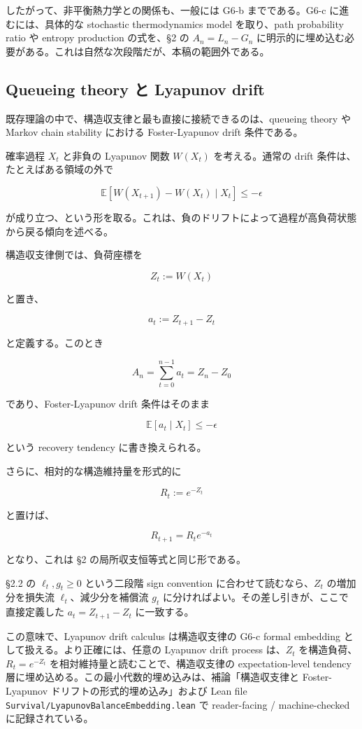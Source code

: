 \documentclass[12pt,a4paper]{article}
\begin{document}
したがって、非平衡熱力学との関係も、一般には G6-b までである。G6-c に進むには、具体的な stochastic thermodynamics model を取り、path probability ratio や entropy production の式を、§2 の \(A_{n}=L_{n}-G_{n}\) に明示的に埋め込む必要がある。これは自然な次段階だが、本稿の範囲外である。

\subsection{Queueing theory と Lyapunov drift}\label{queueing-theory-ux3068-lyapunov-drift}

既存理論の中で、構造収支律と最も直接に接続できるのは、queueing theory や Markov chain stability における Foster-Lyapunov drift 条件である。

確率過程 \(X_{t}\) と非負の Lyapunov 関数 \(W(X_{t})\) を考える。通常の drift 条件は、たとえばある領域の外で

\[
\mathbb E[W(X_{t+1})-W(X_{t})\mid X_{t}]\le -\epsilon
\]

が成り立つ、という形を取る。これは、負のドリフトによって過程が高負荷状態から戻る傾向を述べる。

構造収支律側では、負荷座標を

\[
Z_{t} := W(X_{t})
\]

と置き、

\[
a_{t} := Z_{t+1}-Z_{t}
\]

と定義する。このとき

\[
A_{n} = \sum_{t=0}^{n-1} a_{t} = Z_{n}-Z_0
\]

であり、Foster-Lyapunov drift 条件はそのまま

\[
\mathbb E[a_{t}\mid X_{t}]\le -\epsilon
\]

という recovery tendency に書き換えられる。

さらに、相対的な構造維持量を形式的に

\[
R_{t} := e^{-Z_{t}}
\]

と置けば、

\[
R_{t+1}=R_{t} e^{-a_{t}}
\]

となり、これは §2 の局所収支恒等式と同じ形である。

§2.2 の \(\ell_{t},g_{t}\ge 0\) という二段階 sign convention に合わせて読むなら、\(Z_{t}\) の増加分を損失流 \(\ell_{t}\)、減少分を補償流 \(g_{t}\) に分ければよい。その差し引きが、ここで直接定義した \(a_{t}=Z_{t+1}-Z_{t}\) に一致する。

この意味で、Lyapunov drift calculus は構造収支律の G6-c formal embedding として扱える。より正確には、任意の Lyapunov drift process は、\(Z_{t}\) を構造負荷、\(R_{t}=e^{-Z_{t}}\) を相対維持量と読むことで、構造収支律の expectation-level tendency 層に埋め込める。この最小代数的埋め込みは、補論「構造収支律と Foster-Lyapunov ドリフトの形式的埋め込み」および Lean file \texttt{Survival/LyapunovBalanceEmbedding.lean} で reader-facing / machine-checked に記録されている。
\end{document}
